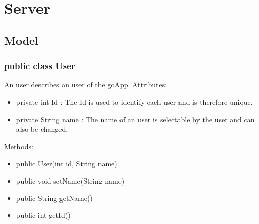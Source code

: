 
\section{Server}
	\subsection{Model}

	\subsubsection{public class User}
	An user describes an user of the goApp.
	\newline Attributes:
	\begin{itemize}
	\item private int Id : The Id is used to identify each user and is therefore unique.
	\item private String name : The name of an user is selectable by the user and can also be changed.
	\end{itemize}
	Methods: 
	\begin{itemize}
	\item public User(int id, String name)
	\item public void setName(String name)
	\item public String getName()
	\item public int getId()
	\end{itemize}

